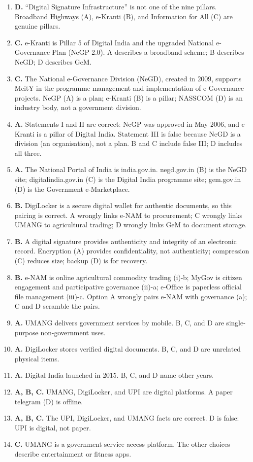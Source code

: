 \begin{enumerate}[label=\textbf{Q\arabic*.}, leftmargin=*]
  (15 August 2014, 1 January 2016, 26 January 2015) are not the launch date.
\item \textbf{D.} ``Digital Signature Infrastructure'' is not one of the nine
  pillars. Broadband Highways (A), e-Kranti (B), and Information for All
  (C) are genuine pillars.
\item \textbf{C.} e-Kranti is Pillar 5 of Digital India and the upgraded
  National e-Governance Plan (NeGP 2.0). A describes a broadband scheme; B
  describes NeGD; D describes GeM.
\item \textbf{C.} The National e-Governance Division (NeGD), created in 2009,
  supports MeitY in the programme management and implementation of
  e-Governance projects. NeGP (A) is a plan; e-Kranti (B) is a pillar;
  NASSCOM (D) is an industry body, not a government division.
\item \textbf{A.} Statements I and II are correct: NeGP was approved in May
  2006, and e-Kranti is a pillar of Digital India. Statement III is false
  because NeGD is a division (an organisation), not a plan. B and C include
  false III; D includes all three.
\item \textbf{A.} The National Portal of India is india.gov.in. negd.gov.in
  (B) is the NeGD site; digitalindia.gov.in (C) is the Digital India
  programme site; gem.gov.in (D) is the Government e-Marketplace.
\item \textbf{B.} DigiLocker is a secure digital wallet for authentic
  documents, so this pairing is correct. A wrongly links e-NAM to
  procurement; C wrongly links UMANG to agricultural trading; D wrongly
  links GeM to document storage.
\item \textbf{B.} A digital signature provides authenticity and integrity of
  an electronic record. Encryption (A) provides confidentiality, not
  authenticity; compression (C) reduces size; backup (D) is for recovery.
\item \textbf{B.} e-NAM is online agricultural commodity trading (i)-b;
  MyGov is citizen engagement and participative governance (ii)-a; e-Office
  is paperless official file management (iii)-c. Option A wrongly pairs
  e-NAM with governance (a); C and D scramble the pairs.

\item \textbf{A.} UMANG delivers government services by mobile. B, C, and D are single-purpose non-government uses.
\item \textbf{A.} DigiLocker stores verified digital documents. B, C, and D are unrelated physical items.
\item \textbf{A.} Digital India launched in 2015. B, C, and D name other years.
\item \textbf{A, B, C.} UMANG, DigiLocker, and UPI are digital platforms. A paper telegram (D) is offline.
\item \textbf{A, B, C.} The UPI, DigiLocker, and UMANG facts are correct. D is false: UPI is digital, not paper.
\item \textbf{C.} UMANG is a government-service access platform. The other choices describe entertainment or fitness apps.


\end{enumerate}
